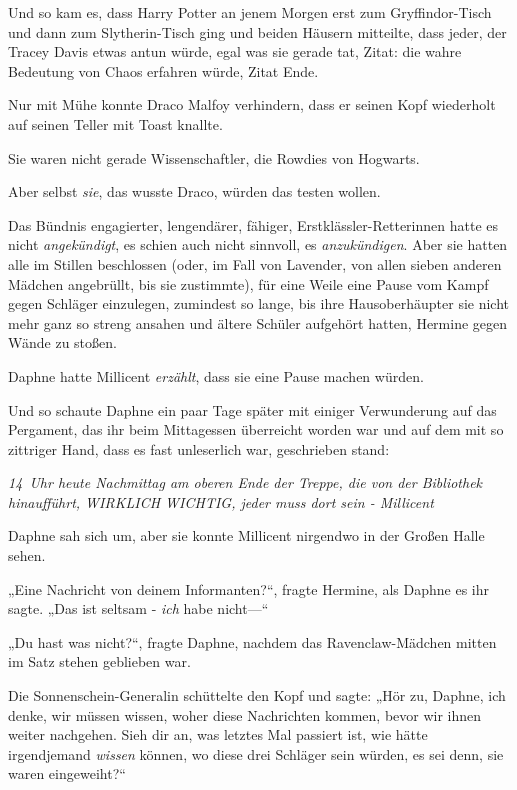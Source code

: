 {Und so kam es, dass Harry Potter an jenem Morgen erst zum Gryffindor-Tisch und dann zum Slytherin-Tisch ging und beiden Häusern mitteilte, dass jeder, der Tracey Davis etwas antun würde, egal was sie gerade tat, Zitat: die wahre Bedeutung von Chaos erfahren würde, Zitat Ende.

Nur mit Mühe konnte Draco Malfoy verhindern, dass er seinen Kopf wiederholt auf seinen Teller mit Toast knallte.

Sie waren nicht gerade Wissenschaftler, die Rowdies von Hogwarts.

Aber selbst \emph{sie}, das wusste Draco, würden das testen wollen.

Das Bündnis engagierter, lengendärer, fähiger, Erstklässler-Retterinnen hatte es nicht \emph{angekündigt}, es schien auch nicht sinnvoll, es \emph{anzukündigen}. Aber sie hatten alle im Stillen beschlossen (oder, im Fall von Lavender, von allen sieben anderen Mädchen angebrüllt, bis sie zustimmte), für eine Weile eine Pause vom Kampf gegen Schläger einzulegen, zumindest so lange, bis ihre Hausoberhäupter sie nicht mehr ganz so streng ansahen und ältere Schüler aufgehört hatten, Hermine gegen Wände zu stoßen.

Daphne hatte Millicent \emph{erzählt}, dass sie eine Pause machen würden.

Und so schaute Daphne ein paar Tage später mit einiger Verwunderung auf das Pergament, das ihr beim Mittagessen überreicht worden war und auf dem mit so zittriger Hand, dass es fast unleserlich war, geschrieben stand:

\emph{14~Uhr heute Nachmittag am oberen Ende der Treppe, die von der Bibliothek hinaufführt, WIRKLICH WICHTIG, jeder muss dort sein - Millicent}

Daphne sah sich um, aber sie konnte Millicent nirgendwo in der Großen Halle sehen.

„Eine Nachricht von deinem Informanten?“, fragte Hermine, als Daphne es ihr sagte. „Das ist seltsam - \emph{ich} habe nicht—“

„Du hast was nicht?“, fragte Daphne, nachdem das Ravenclaw-Mädchen mitten im Satz stehen geblieben war.

Die Sonnenschein-Generalin schüttelte den Kopf und sagte: „Hör zu, Daphne, ich denke, wir müssen wissen, woher diese Nachrichten kommen, bevor wir ihnen weiter nachgehen. Sieh dir an, was letztes Mal passiert ist, wie hätte irgendjemand \emph{wissen} können, wo diese drei Schläger sein würden, es sei denn, sie waren eingeweiht?“

}
